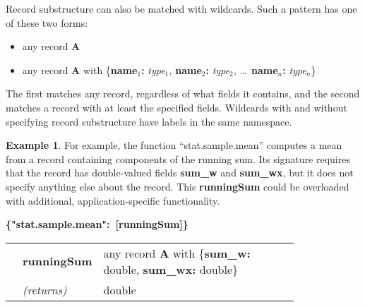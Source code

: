 \documentclass{article}
\newcommand{\PFAc}{\ttfamily\bfseries}
\newcommand{\PFAp}{\ttfamily\bfseries}
\newcommand{\PFAtp}{\ttfamily\bfseries}
\newcommand{\PFApf}{\ttfamily\bfseries}
\theoremstyle{definition}
\newtheorem{example}{Example}[section]
\begin{document}
Record substructure can also be matched with wildcards.  Such a pattern has one of these two forms:
\begin{itemize}
\item any record {\PFAp A}
\item any record {\PFAp A} with \{{\PFApf name$_1$:} {\it type$_1$,} {\PFApf name$_2$:} {\it type$_2$,} \ldots\ {\PFApf name$_n$:} {\it type$_n$}\}
\end{itemize}
The first matches any record, regardless of what fields it contains, and the second matches a record with at least the specified fields.  Wildcards with and without specifying record substructure have labels in the same namespace.

\begin{example}
For example, the function ``stat.sample.mean'' computes a mean from a record containing components of the running sum.  Its signature requires that the record has double-valued fields {\PFApf sum\_w} and {\PFApf sum\_wx}, but it does not specify anything else about the record.  This {\PFAc runningSum} could be overloaded with additional, application-specific functionality.
\begin{center}
\begin{minipage}{0.9\linewidth}
\mbox{\PFAc \{"stat.sample.mean":$\!$ [runningSum]\} \vspace{0.2 cm} \\} \vspace{0.2 cm} \\ \rm \begin{tabular}{p{0.01\linewidth} l p{0.8\linewidth}} & \PFAc runningSum \rm & any record {\PFAtp A} with \{{\PFApf sum\_w:}$\!$ double, {\PFApf sum\_wx:}$\!$ double\} \\  & {\it (returns)} & double \\ \end{tabular}
\end{minipage}
\end{center}
\end{example}
\end{document}
